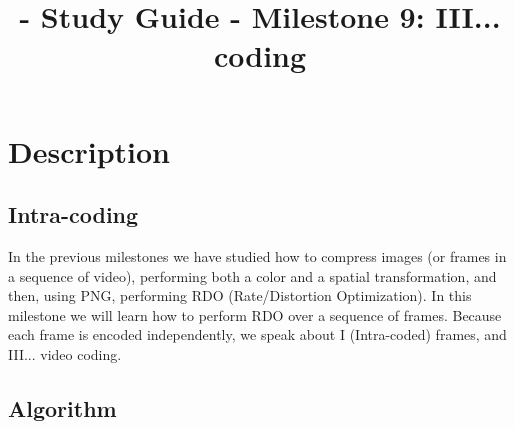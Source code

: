 
\title{\SM{} - Study Guide - Milestone 9: III... coding}

\maketitle

\tableofcontents

\section{Description}

\subsection{Intra-coding}

In the previous milestones we have studied how to compress images (or
frames in a sequence of video), performing both a color and a spatial
transformation, and then, using PNG, performing RDO (Rate/Distortion
Optimization). In this milestone we will learn how to perform RDO over
a sequence of frames. Because each frame is encoded independently, we
speak about I (Intra-coded) frames, and III... video coding.

\subsection{Algorithm}

